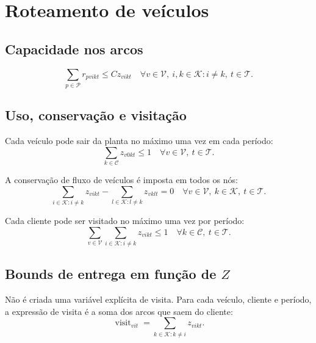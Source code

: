 \documentclass[11pt,a4paper]{article}
\newcommand{\set}[1]{\mathcal{#1}}
\begin{document}
\section{Roteamento de veículos}

\subsection{Capacidade nos arcos}

\begin{equation}
  \sum_{p\in\set{P}}r_{pvikt}\le C z_{vikt}
  \quad \forall v\in\set{V},\ i,k\in\set{K}:i\ne k,\ t\in\set{T}.
  \label{eq:arc-capacity}
\end{equation}

\subsection{Uso, conservação e visitação}

Cada veículo pode sair da planta no máximo uma vez em cada período:
\begin{equation}
  \sum_{k\in\set{C}}z_{v0kt}\le1
  \quad \forall v\in\set{V},\ t\in\set{T}.
  \label{eq:one-departure}
\end{equation}

A conservação de fluxo de veículos é imposta em todos os nós:
\begin{equation}
  \sum_{i\in\set{K}:i\ne k}z_{vikt}
  -\sum_{l\in\set{K}:l\ne k}z_{vklt}=0
  \quad \forall v\in\set{V},\ k\in\set{K},\ t\in\set{T}.
  \label{eq:vehicle-flow}
\end{equation}

Cada cliente pode ser visitado no máximo uma vez por período:
\begin{equation}
  \sum_{v\in\set{V}}\sum_{i\in\set{K}:i\ne k}z_{vikt}\le1
  \quad \forall k\in\set{C},\ t\in\set{T}.
  \label{eq:single-visit}
\end{equation}

\subsection{Bounds de entrega em função de $Z$}

Não é criada uma variável explícita de visita. Para cada veículo, cliente e
período, a expressão de visita é a soma dos arcos que saem do cliente:
\begin{equation}
  \operatorname{visit}_{vit}=\sum_{k\in\set{K}:k\ne i}z_{vikt}.
  \label{eq:z-visit-indicator}
\end{equation}
\end{document}
